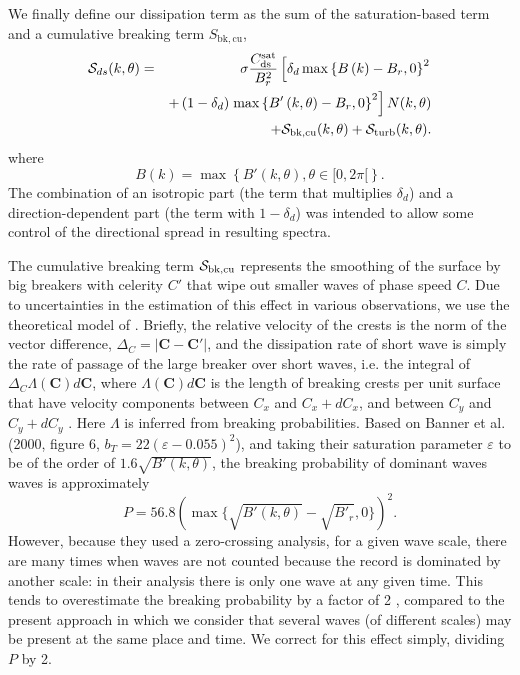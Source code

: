 We finally define our dissipation term as the sum of the saturation-based term and a cumulative breaking term
$S_{\mathrm{bk,cu}}$, 
\begin{eqnarray}
{\cal S}_{ds}(k,\theta)& =&  \sigma
 \frac{C_{\mathrm{ds}}^{\mathrm{sat}}}{B^2_r} \left[ \delta_d
\max\left\{ B\left(k\right) -
B_r,0\right\}^2 \right.
\nonumber \\
  & & +  \left(1-\delta_d \right) \left. \max\left\{B'\left(k,\theta \right)- B_r
 ,0\right\}^2\right]N(k,\theta)  \nonumber \\
 & & + {\cal S}_{\mathrm{bk,cu}}(k,\theta) + {\cal S}_{\mathrm{turb}}(k,\theta) \label{Sds_all}.
\end{eqnarray}
where
\begin{equation}
B\left(k \right)=\max\left\{B'(k,\theta), \theta \in [0,2
\pi[\right\} \label{defBof}.
\end{equation}
The combination of an isotropic part (the term that multiplies $ \delta_d$) and a direction-dependent part (the term with  $1-\delta_d$) was intended
 to allow some control of the directional spread in resulting spectra. 

The cumulative breaking term ${\cal S}_{\mathrm{bk,cu}}$ represents the smoothing of the
surface by big breakers with celerity $C'$ that wipe out smaller
waves of phase speed $C$. Due to
uncertainties in the estimation of this effect in various observations,
we use the theoretical model of \cite{art:Aea09}. Briefly,
the relative velocity of the crests is the norm of the vector
difference, $\Delta_C =\left|\mathbf{C}-\mathbf{C}'\right|$, and
the dissipation rate of short wave is simply the rate of passage
of the large breaker over short waves, i.e. the integral of
$\Delta_C \Lambda(\mathbf{C}) d\mathbf{C}$, where $\Lambda
(\mathbf{C}) d\mathbf{C}$ is the length of breaking crests per
unit surface that have velocity components between $C_x$ and
$C_x+dC_x$, and between $C_y$ and $C_y+dC_y$ \citep{art:Phi85}.
Here $\Lambda$ is inferred from breaking
probabilities. Based on  Banner et al. (2000, figure 6, $b_T=22 \left(\varepsilon-0.055\right)^2$)\nocite{art:BBY00}, and
taking their saturation parameter $\varepsilon$ to be of the order
of $1.6 \sqrt{B'(k,\theta)}$, the breaking probability of dominant waves
waves is approximately
\begin{equation}
P=56.8\left(\max\{\sqrt{B'(k,\theta)}-\sqrt{B'_r},0\}\right)^2.\label{PBanner}
\end{equation}
However, because they used a zero-crossing analysis, 
for a given wave scale, there are many times when waves are not counted because the record is dominated by another scale: in their analysis there is only one wave at any given time.
This tends to overestimate the breaking probability by a factor of 2 \citep{art:FAB10}, compared to the present approach in which we consider that several waves (of different scales) 
may be present at the same place and time. We correct for this effect simply, dividing 
$P$ by 2. 

